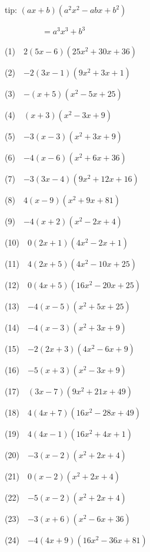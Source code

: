 \documentclass[a4j,twocolumn,10pt,fleqn]{jarticle}
\begin{document}
tip: $\left(a x + b\right) \left(a^{2} x^{2} - a b x + b^{2}\right)$

~~~~~~~~~$=a^{3} x^{3} + b^{3}$


(1)~~$2\left(5 x - 6\right) \left(25 x^{2} + 30 x + 36\right)$

(2)~~$-2\left(3 x - 1\right) \left(9 x^{2} + 3 x + 1\right)$

(3)~~$-\left(x + 5\right) \left(x^{2} - 5 x + 25\right)$

(4)~~$\left(x + 3\right) \left(x^{2} - 3 x + 9\right)$

(5)~~$-3\left(x - 3\right) \left(x^{2} + 3 x + 9\right)$

(6)~~$-4\left(x - 6\right) \left(x^{2} + 6 x + 36\right)$

(7)~~$-3\left(3 x - 4\right) \left(9 x^{2} + 12 x + 16\right)$

(8)~~$4\left(x - 9\right) \left(x^{2} + 9 x + 81\right)$

(9)~~$-4\left(x + 2\right) \left(x^{2} - 2 x + 4\right)$

(10)~~$0\left(2 x + 1\right) \left(4 x^{2} - 2 x + 1\right)$

(11)~~$4\left(2 x + 5\right) \left(4 x^{2} - 10 x + 25\right)$

(12)~~$0\left(4 x + 5\right) \left(16 x^{2} - 20 x + 25\right)$

(13)~~$-4\left(x - 5\right) \left(x^{2} + 5 x + 25\right)$

(14)~~$-4\left(x - 3\right) \left(x^{2} + 3 x + 9\right)$

(15)~~$-2\left(2 x + 3\right) \left(4 x^{2} - 6 x + 9\right)$

(16)~~$-5\left(x + 3\right) \left(x^{2} - 3 x + 9\right)$

(17)~~$\left(3 x - 7\right) \left(9 x^{2} + 21 x + 49\right)$

(18)~~$4\left(4 x + 7\right) \left(16 x^{2} - 28 x + 49\right)$

(19)~~$4\left(4 x - 1\right) \left(16 x^{2} + 4 x + 1\right)$

(20)~~$-3\left(x - 2\right) \left(x^{2} + 2 x + 4\right)$

(21)~~$0\left(x - 2\right) \left(x^{2} + 2 x + 4\right)$

(22)~~$-5\left(x - 2\right) \left(x^{2} + 2 x + 4\right)$

(23)~~$-3\left(x + 6\right) \left(x^{2} - 6 x + 36\right)$

(24)~~$-4\left(4 x + 9\right) \left(16 x^{2} - 36 x + 81\right)$
\end{document}
